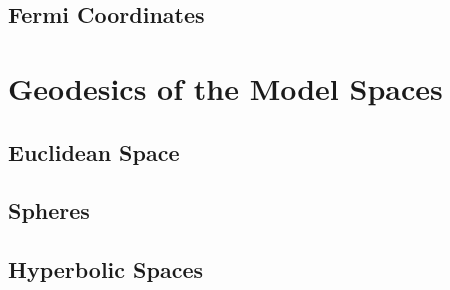 \documentclass[11pt]{article}
\begin{document}
\subsection{Fermi Coordinates}

\section{Geodesics of the Model Spaces}
\subsection{Euclidean Space}
\subsection{Spheres}
\subsection{Hyperbolic Spaces}

\newpage


\end{document}
